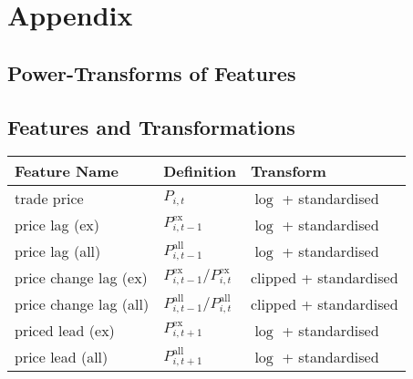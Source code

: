 \section{Appendix}


\newpage
\subsection{Power-Transforms of Features}
\label{app:power-transforms-of-features}

\subsection{Features and Transformations}
\label{app:feature-and-transformations}

\begin{table}[H]
    \centering
    \begin{threeparttable}
        \begin{tabular}{@{}lll@{}}
            \toprule
            Feature Name            & Definition                                                                                       & Transform \\ \midrule
            trade price             & $P_{i, t}$                                                                                       & $\log$ + standardised \\
            price lag (ex)          & $P_{i, t-1}^{\text{ex}}$\tnote{*}                                                                & $\log$ + standardised          \\
            price lag (all)         & $P_{i, t-1}^{\text{all}}$\tnote{*}                                                               & $\log$ + standardised          \\
            price change lag (ex)   & $P_{i, t-1}^{\text{ex}}/P_{i, t}^{\text{ex}}$\tnote{*}                                           & clipped + standardised          \\
            price change lag (all)  & $P_{i, t-1}^{\text{all}}/P_{i, t}^{\text{all}}$\tnote{*}                                         & clipped + standardised          \\
            priced lead (ex)        & $P_{i, t+1}^{\text{ex}}$\tnote{*}                                                                & $\log$ + standardised          \\
            price lead (all)        & $P_{i, t+1}^{\text{all}}$\tnote{*}                                                               & $\log$ + standardised          \\

\end{tabular}
\end{threeparttable}
\end{table}
